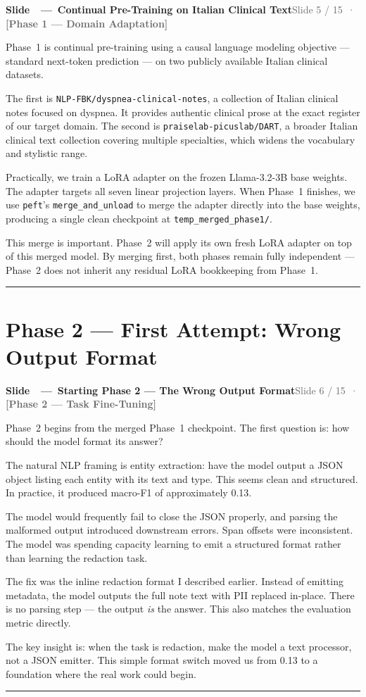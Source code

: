 \documentclass[11pt,a4paper]{article}
\newcommand{\phaselabel}[2]{\textbf{\textcolor{#1}{[#2]}}}
\newcounter{slidectr}
\newcommand{\slidescript}[3]{%
  \stepcounter{slidectr}
  \begin{slidebox}
    \noindent\textbf{Slide \theslidectr\ \,—\, #1}\hfill\small\textcolor{dimgray}{#2}
  \end{slidebox}
  \vspace{0.4em}
  #3
  \vspace{1.2em}
  \noindent\textcolor{dimgray!60}{\rule{\linewidth}{0.4pt}}
  \vspace{0.6em}
}
\begin{document}
\slidescript{Continual Pre-Training on Italian Clinical Text}{Slide 5 / 15 \,·\, \phaselabel{phase1}{Phase 1 — Domain Adaptation}}{

Phase~1 is continual pre-training using a causal language modeling objective — standard next-token prediction — on two publicly available Italian clinical datasets.

The first is \texttt{NLP-FBK/dyspnea-clinical-notes}, a collection of Italian clinical notes focused on dyspnea. It provides authentic clinical prose at the exact register of our target domain. The second is \texttt{praiselab-picuslab/DART}, a broader Italian clinical text collection covering multiple specialties, which widens the vocabulary and stylistic range.

Practically, we train a LoRA adapter on the frozen Llama-3.2-3B base weights. The adapter targets all seven linear projection layers. When Phase~1 finishes, we use \texttt{peft}'s \texttt{merge\_and\_unload} to merge the adapter directly into the base weights, producing a single clean checkpoint at \texttt{temp\_merged\_phase1/}.

This merge is important. Phase~2 will apply its own fresh LoRA adapter on top of this merged model. By merging first, both phases remain fully independent — Phase~2 does not inherit any residual LoRA bookkeeping from Phase~1.

}

\section{Phase 2 --- First Attempt: Wrong Output Format}

\slidescript{Starting Phase 2 — The Wrong Output Format}{Slide 6 / 15 \,·\, \phaselabel{phase2}{Phase 2 — Task Fine-Tuning}}{

Phase~2 begins from the merged Phase~1 checkpoint. The first question is: how should the model format its answer?

The natural NLP framing is entity extraction: have the model output a JSON object listing each entity with its text and type. This seems clean and structured. In practice, it produced macro-F1 of approximately 0.13.

The model would frequently fail to close the JSON properly, and parsing the malformed output introduced downstream errors. Span offsets were inconsistent. The model was spending capacity learning to emit a structured format rather than learning the redaction task.

The fix was the inline redaction format I described earlier. Instead of emitting metadata, the model outputs the full note text with PII replaced in-place. There is no parsing step — the output \emph{is} the answer. This also matches the evaluation metric directly.

The key insight is: when the task is redaction, make the model a text processor, not a JSON emitter. This simple format switch moved us from 0.13 to a foundation where the real work could begin.

}
\end{document}
